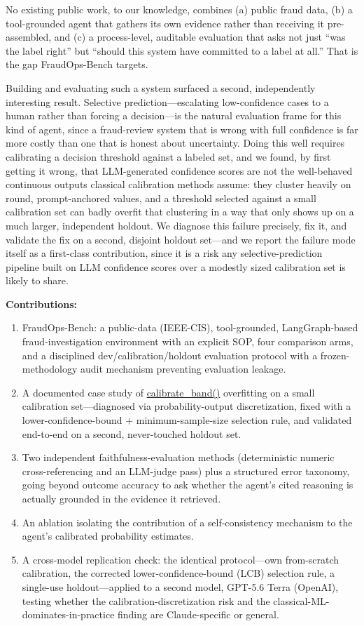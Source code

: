 \documentclass[]{ieeeaccess}
\newcommand{\code}[1]{\url{#1}}
\begin{document}
No existing public work, to our knowledge, combines (a) public fraud
data, (b) a tool-grounded agent that gathers its own evidence rather than
receiving it pre-assembled, and (c) a process-level, auditable evaluation
that asks not just ``was the label right'' but ``should this system have
committed to a label at all.'' That is the gap FraudOps-Bench targets.

Building and evaluating such a system surfaced a second, independently
interesting result. Selective prediction---escalating low-confidence
cases to a human rather than forcing a decision---is the natural
evaluation frame for this kind of agent, since a fraud-review system that
is wrong with full confidence is far more costly than one that is honest
about uncertainty. Doing this well requires calibrating a decision
threshold against a labeled set, and we found, by first getting it wrong,
that LLM-generated confidence scores are not the well-behaved continuous
outputs classical calibration methods assume: they cluster heavily on
round, prompt-anchored values, and a threshold selected against a small
calibration set can badly overfit that clustering in a way that only
shows up on a much larger, independent holdout. We diagnose this failure
precisely, fix it, and validate the fix on a second, disjoint holdout set---and we report the failure mode itself as a first-class contribution,
since it is a risk any selective-prediction pipeline built on LLM
confidence scores over a modestly sized calibration set is likely to
share.

\textbf{Contributions:}
\begin{enumerate}
\item FraudOps-Bench: a public-data (IEEE-CIS), tool-grounded,
  LangGraph-based fraud-investigation environment with an explicit SOP,
  four comparison arms, and a disciplined dev/calibration/holdout
  evaluation protocol with a frozen-methodology audit mechanism
  preventing evaluation leakage.
\item A documented case study of \code{calibrate_band()} overfitting on a
  small calibration set---diagnosed via probability-output
  discretization, fixed with a lower-confidence-bound + minimum-sample-size
  selection rule, and validated end-to-end on a second, never-touched
  holdout set.
\item Two independent faithfulness-evaluation methods (deterministic
  numeric cross-referencing and an LLM-judge pass) plus a structured
  error taxonomy, going beyond outcome accuracy to ask whether the
  agent's cited reasoning is actually grounded in the evidence it
  retrieved.
\item An ablation isolating the contribution of a self-consistency
  mechanism to the agent's calibrated probability estimates.
\item A cross-model replication check: the identical protocol---own
  from-scratch calibration, the corrected lower-confidence-bound (LCB)
  selection rule, a
  single-use holdout---applied to a second model, GPT-5.6 Terra
  (OpenAI), testing whether the calibration-discretization risk and the
  classical-ML-dominates-in-practice finding are Claude-specific or
  general.
\end{enumerate}
\end{document}
